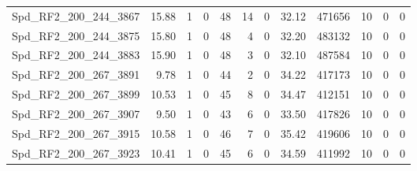 \begin{longtable}[c]{@{}lrrrrrrrrrrr@{}}
Spd\_RF2\_200\_244\_3867      & 15.88                  & 1                       & 0                       & 48                     & 14                      & 0                       & 32.12                   & 471656                   & 10                       & 0                        & 0                        \\
Spd\_RF2\_200\_244\_3875      & 15.80                  & 1                       & 0                       & 48                     & 4                       & 0                       & 32.20                   & 483132                   & 10                       & 0                        & 0                        \\
Spd\_RF2\_200\_244\_3883      & 15.90                  & 1                       & 0                       & 48                     & 3                       & 0                       & 32.10                   & 487584                   & 10                       & 0                        & 0                        \\
Spd\_RF2\_200\_267\_3891      & 9.78                   & 1                       & 0                       & 44                     & 2                       & 0                       & 34.22                   & 417173                   & 10                       & 0                        & 0                        \\
Spd\_RF2\_200\_267\_3899      & 10.53                  & 1                       & 0                       & 45                     & 8                       & 0                       & 34.47                   & 412151                   & 10                       & 0                        & 0                        \\
Spd\_RF2\_200\_267\_3907      & 9.50                   & 1                       & 0                       & 43                     & 6                       & 0                       & 33.50                   & 417826                   & 10                       & 0                        & 0                        \\
Spd\_RF2\_200\_267\_3915      & 10.58                  & 1                       & 0                       & 46                     & 7                       & 0                       & 35.42                   & 419606                   & 10                       & 0                        & 0                        \\
Spd\_RF2\_200\_267\_3923      & 10.41                  & 1                       & 0                       & 45                     & 6                       & 0                       & 34.59                   & 411992                   & 10                       & 0                        & 0                        \\

\end{longtable}
